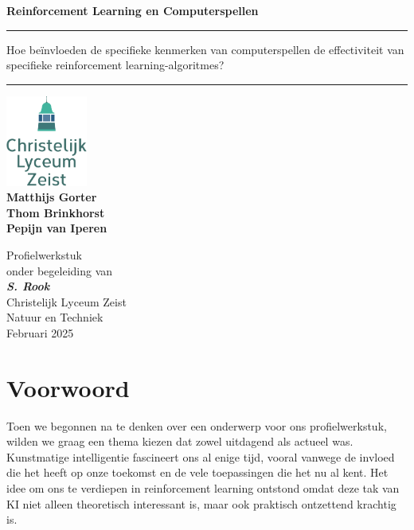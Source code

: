 \documentclass[a4paper,12pt]{report}
\begin{document}
\begin{titlepage}
    \centering
    \vspace*{1cm}
    \Huge\textbf{Reinforcement Learning en Computerspellen} \\
    \vspace{1cm}
    \rule{\linewidth}{0.4mm}
    \Large
    Hoe beïnvloeden de specifieke kenmerken van computerspellen de effectiviteit van specifieke reinforcement learning-algoritmes?
    \rule{\linewidth}{0.4mm}

    \vspace{1.5cm}
    \includegraphics[width=0.2\textwidth]{assets/logo-clz.png} \\
    \vspace{1.5cm}
    \large
    \textbf{Matthijs Gorter} \\
    \textbf{Thom Brinkhorst} \\
    \textbf{Pepijn van Iperen} \\
    \vspace{\fill}
    \normalsize

    Profielwerkstuk \\ onder begeleiding van \\ \textit{\textbf{S. Rook}} \\
    Christelijk Lyceum Zeist \\ Natuur en Techniek \\ Februari 2025 \\ \newpage
\end{titlepage}

\chapter*{Voorwoord}

Toen we begonnen na te denken over een onderwerp voor ons profielwerkstuk,
wilden we graag een thema kiezen dat zowel uitdagend als actueel was.
Kunstmatige intelligentie fascineert ons al enige tijd, vooral vanwege de
invloed die het heeft op onze toekomst en de vele toepassingen die het nu al
kent. Het idee om ons te verdiepen in reinforcement learning ontstond omdat
deze tak van KI niet alleen theoretisch interessant is, maar ook praktisch
ontzettend krachtig is.
\end{document}
